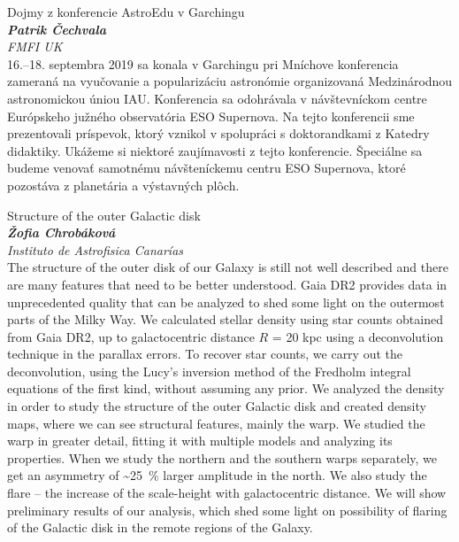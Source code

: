 \documentclass[a4paper]{report}
\begin{document}
                    \begin{tcolorbox}[
                                    colback=white,
                    colframe=black!70!white,
                                fonttitle=\Large\bfseries,
                title=11:00
            ]
                {\Large Dojmy z konferencie AstroEdu v Garchingu}
                                                            \\ \textbf{\textit{Patrik Čechvala}}
                                                    \\ \textit{FMFI UK}                \\[2ex]16.--18. septembra 2019 sa konala v Garchingu pri Mníchove konferencia zameraná na vyučovanie a popularizáciu astronómie organizovaná Medzinárodnou astronomickou úniou IAU. Konferencia sa odohrávala v návštevníckom centre Európskeho južného observatória ESO Supernova. Na tejto konferencii sme prezentovali príspevok, ktorý vznikol v spolupráci s doktorandkami z Katedry didaktiky. Ukážeme si niektoré zaujímavosti z tejto konferencie. Špeciálne sa budeme venovať samotnému návšteníckemu centru ESO Supernova, ktoré pozostáva z planetária a výstavných plôch.
            \end{tcolorbox}
                    \begin{tcolorbox}[
                                    colback=white,
                    colframe=black!70!white,
                                fonttitle=\Large\bfseries,
                title=11:45
            ]
                {\Large Structure of the outer Galactic disk}
                                                            \\ \textbf{\textit{Žofia Chrobáková}}
                                                    \\ \textit{Instituto de Astrofisica Canarías}                \\[2ex]The structure of the outer disk of our Galaxy is still not well described and there are many features that need to be better understood. Gaia DR2 provides data in unprecedented quality that can be analyzed to shed some light on the outermost parts of the Milky Way. We calculated stellar density using star counts obtained from Gaia DR2, up to galactocentric distance $R$ = 20 kpc using a deconvolution technique in the parallax errors. To recover star counts, we carry out the deconvolution, using the Lucy's inversion method of the Fredholm integral equations of the first kind, without assuming any prior. We analyzed the density in order to study the structure of the outer Galactic disk and created density maps, where we can see structural features, mainly the warp. We studied the warp in greater detail, fitting it with multiple models and analyzing its properties. When we study the northern and the southern warps separately, we get an asymmetry of \textasciitilde\SI{25}{\percent} larger amplitude in the north. We also study the flare -- the increase of the scale-height with galactocentric distance. We will show preliminary results of our analysis, which shed some light on possibility of flaring of the Galactic disk in the remote regions of the Galaxy.
            \end{tcolorbox}
\end{document}
